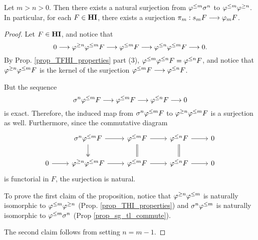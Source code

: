 \begin{prop}\label{prop_struct_consts}
Let $m > n > 0$. Then there exists a natural surjection from 
$\varphi^{\leq m} \sigma^{n}$ to $\varphi^{\leq m} \varphi^{\geq n}$. In particular, for 
each $F \in \mathbf{HI}$, there exists a surjection $\pi_m: s_m F \longrightarrow 
\varphi_{m} F$.
\end{prop}
\begin{proof}
Let $F \in \mathbf{HI}$, and notice that
\[
0 \longrightarrow \varphi^{\geq n} \varphi^{\leq m} F \longrightarrow \varphi^{\leq m} F \longrightarrow 
  \varphi^{\leq n} \varphi^{\leq m} F \longrightarrow 0.
\]
By Prop. \ref{prop_TFHI_properties} part (3), $\varphi^{\leq m} \varphi^{\leq n} F 
= \varphi^{\leq n} F$, and notice that $\varphi^{\geq n} \varphi^{\leq m} F$ is the kernel 
of the surjection $\varphi^{\leq m} F \longrightarrow \varphi^{\leq n} F$.

But the sequence
\[
\sigma^{n} \varphi^{\leq m} F \longrightarrow \varphi^{\leq m} F \longrightarrow \varphi^{\leq n} F \longrightarrow 0
\]
is exact. Therefore, the induced map from $\sigma^{n} \varphi^{\leq m} F$
to $\varphi^{\geq n} \varphi^{\leq m} F$ is a surjection as well. Furthermore,
since the commutative diagram
\[
\begin{tikzcd}
{} & \sgHI{n} \tlHI{m} F \arrow{r} \arrow[twoheadrightarrow]{d} &
\tlHI{m} F \arrow{r} \arrow[equal]{d} &
\tlHI{n} F \arrow{r} \arrow[equal]{d} &
0 \\
0 \arrow{r} &
\tgHI{n} \tlHI{m} F \arrow{r} &
\tlHI{m} F \arrow{r} &
\tlHI{n} F \arrow{r} &
0
\end{tikzcd}
\] 
is functorial in $F$, the surjection is natural.

To prove the first claim of the proposition, notice that 
$\varphi^{\geq n} \varphi^{\leq m}$ is naturally isomorphic to $\varphi^{\leq m} \varphi^{\geq n}$ 
(Prop. \ref{prop_THI_properties}) and $\sigma^{n} \varphi^{\leq m}$ is 
naturally isomorphic to $\varphi^{\leq m} \sigma^{n}$ (Prop 
\ref{prop_sg_tl_commute}).

The second claim follows from setting $n = m - 1$.
\end{proof}
